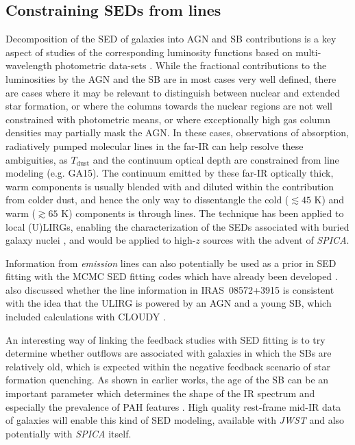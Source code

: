 \documentclass{pasa}%
\begin{document}
\subsection{Constraining SEDs from lines}
\label{sec:seds}


Decomposition of the SED of galaxies into AGN and SB contributions is a key
aspect of studies of the corresponding luminosity functions based on 
multi-wavelength photometric data-sets \citep[e.g.][]{gru13,gru16,del14}. 
While the fractional contributions to the luminosities by the AGN and the SB
are in most cases very well defined, there are cases where it may be relevant
to distinguish between nuclear and extended star formation, or where the
columns towards the nuclear regions are not well constrained with photometric
means, or where exceptionally high gas column densities may partially mask the
AGN. In these cases, observations of absorption, radiatively pumped molecular
lines in the far-IR can help resolve these ambiguities, as $T_{\mathrm{dust}}$
and the continuum optical depth are constrained from line modeling
(e.g. GA15).  The continuum emitted by these far-IR optically thick, warm
components is usually blended with and diluted within the 
contribution from colder dust, and hence the only way to dissentangle the cold
($\lesssim45$ K) and warm ($\gtrsim65$ K) components is through lines. 
The technique has been applied to local (U)LIRGs, enabling the
characterization of the SEDs associated with buried galaxy nuclei 
\citep[e.g.][GA12,GA17]{fal15,fal17}, and would be applied to high-$z$ sources
with the advent of {\it SPICA}.

Information from {\it emission} lines can also potentially be used as a prior
in SED fitting with the MCMC SED fitting codes which have already been
developed \citep[e.g. the SED Analysis Through Markov Chains,][]{joh13}.
\cite{efs14} also discussed whether the line information in IRAS~08572+3915 is
consistent with the idea that the ULIRG is powered by an AGN and a young
SB, which included calculations with CLOUDY \citep{fer13}.  

An interesting way of linking the feedback studies with SED fitting is to
try determine whether outflows are associated with galaxies in which the
SBs are relatively old, which is expected within the negative
feedback scenario of star formation quenching. As shown in earlier works, the
age of the SB can be an important parameter which determines the shape
of the IR spectrum and especially the prevalence of PAH features 
\citep[e.g.][]{efs00,row09}. High quality rest-frame mid-IR data of
galaxies will enable this kind of SED modeling, available with {\it JWST} and
also potentially with {\it SPICA} itself. 
\end{document}
